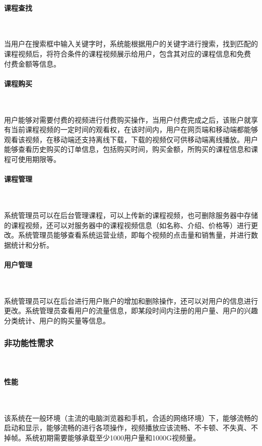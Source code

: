 \paragraph{课程查找}\

当用户在搜索框中输入关键字时，系统能根据用户的关键字进行搜索，找到匹配的课程视频后，将符合条件的课程视频展示给用户，包含其对应的课程信息和免费\\付费金额等信息。

\paragraph{课程购买}\

用户能够对需要付费的视频进行付费购买操作，当用户付费完成之后，该账户就享有当前课程视频的一定时间的观看权，在该时间内，用户在网页端和移动端都能够观看该视频，在移动端还支持离线下载，下载的视频仅可供移动端离线播放。用户能够查看历史购买的订单信息，包括购买时间，购买金额，所购买的课程信息和课程可使用期限等。

\paragraph{课程管理}\

系统管理员可以在后台管理课程，可以上传新的课程视频，也可删除服务器中存储的课程视频，还可以对服务器中的课程视频信息（如名称、介绍、价格等）进行更改。系统管理员能够查看系统运营业绩，即每个视频的点击量和销售量，并进行数据统计和分析。

\paragraph{用户管理}\

系统管理员可以在后台进行用户账户的增加和删除操作，还可以对用户的信息进行更改。系统管理员查看用户的流量信息，即某段时间内注册的用户量、用户的兴趣分类统计、用户的购买量等信息。

\subsubsection{非功能性需求}\

\paragraph{性能}\

该系统在一般环境（主流的电脑浏览器和手机，合适的网络环境）下，能够流畅的启动和显示，能够流畅的进行各项操作，视频播放应该流畅、不卡顿、不失真、不掉帧。系统初期需要能够承载至少1000用户量和1000G视频量。


